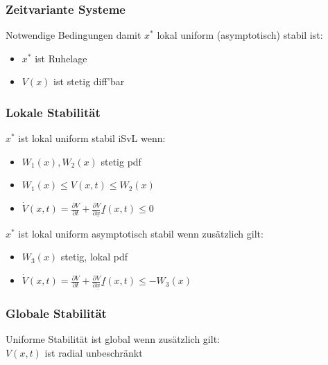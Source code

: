 \documentclass[german]{latex4ei/latex4ei_sheet}
\begin{document}
\begin{sectionbox}
\subsubsection{Zeitvariante Systeme}
Notwendige Bedingungen damit $x^*$ lokal uniform (asymptotisch) stabil ist:
\begin{itemize}
  \item $x^*$ ist Ruhelage
  \item $V(x)$ ist stetig diff'bar
\end{itemize}

\subsubsection{Lokale Stabilität}
$x^*$ ist lokal uniform stabil iSvL wenn:
\begin{itemize}
  \item $W_1(x), W_2(x)$ stetig pdf
  \item $W_1(x) \leq V(x,t) \leq W_2(x)$
  \item $\dot{V}(x,t) = \frac{\partial V}{\partial t} + \frac{\partial V}{\partial \underline{x}} \underline{f}(x,t) \leq 0$
\end{itemize}

$x^*$ ist lokal uniform asymptotisch stabil wenn zusätzlich gilt:
\begin{itemize}
  \item $W_3(x)$ stetig, lokal pdf
  \item $\dot{V}(x,t) = \frac{\partial V}{\partial t} + \frac{\partial V}{\partial \underline{x}} \underline{f}(x,t) \leq -W_3(x)$
\end{itemize}

\subsubsection{Globale Stabilität}
Uniforme Stabilität ist global wenn zusätzlich gilt: \\
$V(x,t)$ ist radial unbeschränkt
\end{sectionbox}
\end{document}
